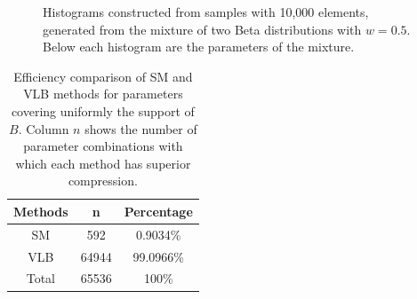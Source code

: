 \documentclass[10pt]{article}
\begin{document}
\begin{figure}[h]
{  }
  \caption{Histograms constructed from samples with 10,000 elements, generated from the mixture of two Beta distributions with $w=0.5$. Below each histogram are the parameters of the mixture.}
  \label{fig:13141516}
\end{figure}

\begin{table}[h]
 \centering
 \caption{Efficiency comparison of SM and VLB methods for parameters covering uniformly the support of $B$. Column $n$ shows the number of parameter combinations with which each method has superior compression.}
 \begin{tabular}{ccc}
  \hline 
  Methods  & n   & Percentage \\
  \hline
  SM	   & 592	& 0.9034\% \\
  VLB	   & 64944	& 99.0966\% \\
  \hline
  Total    & 65536	& 100\% \\
  \hline
 \end{tabular}
 \label{tab:02}
\end{table}
\end{document}

